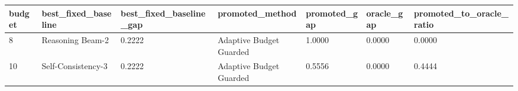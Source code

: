 \begin{tabular}{lllllll}
\hline
budget & best_fixed_baseline & best_fixed_baseline_gap & promoted_method & promoted_gap & oracle_gap & promoted_to_oracle_ratio \\
\hline
8 & Reasoning Beam-2 & 0.2222 & Adaptive Budget Guarded & 1.0000 & 0.0000 & 0.0000 \\
10 & Self-Consistency-3 & 0.2222 & Adaptive Budget Guarded & 0.5556 & 0.0000 & 0.4444 \\
\hline
\end{tabular}
